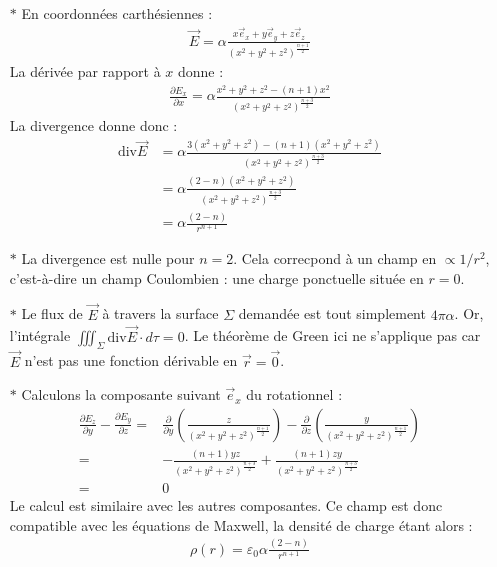 \documentclass{report}
\begin{document}
\begin{itemize}

	\item[$\ast$] En coordonnées carthésiennes :
	\begin{align*}
		\vec{E} = \alpha\frac{x\vec{e}_x+y\vec{e}_y+z\vec{e}_z}{\left(x^2+y^2+z^2 \right)^\frac{n+1}{2}}
	\end{align*}
	La dérivée par rapport à $x$ donne :
	\begin{align*}
		\frac{\partial E_x}{\partial x}=\alpha\frac{x^2+y^2+z^2-(n+1)x^2}{\left(x^2+y^2+z^2 \right)^\frac{n+3}{2}}
	\end{align*}
	La divergence donne donc :
	\begin{align*}
		\mathrm{div}\vec{E} &=\alpha\frac{3(x^2+y^2+z^2)-(n+1)(x^2+y^2+z^2)}{\left(x^2+y^2+z^2 \right)^\frac{n+3}{2}} \\
		&=\alpha\frac{(2-n)(x^2+y^2+z^2)}{\left(x^2+y^2+z^2 \right)^\frac{n+3}{2}} \\
		&=\alpha\frac{(2-n)}{r^{n+1}}
	\end{align*}
	
	\item[$\ast$] La divergence est nulle pour $n=2$. Cela correcpond à un champ en $\propto 1/r^2$, c'est-à-dire un champ Coulombien : une charge ponctuelle située en $r=0$.
	
	\item[$\ast$] Le flux de $\vec{E}$ à travers la surface $\Sigma$ demandée est tout simplement $4\pi\alpha$. Or, l'intégrale $\iiint_\Sigma\mathrm{div}\vec{E}\cdot d\tau=0$. Le théorème de Green ici ne s'applique pas car $\vec{E}$ n'est pas une fonction dérivable en $\vec{r}=\vec{0}$. 
	
	\item[$\ast$] Calculons la composante suivant $\vec{e}_x$ du rotationnel :
	\begin{align*}
		\frac{\partial E_z}{\partial y}-\frac{\partial E_y}{\partial z}=&\frac{\partial }{\partial y}\left( \frac{z}{{\left(x^2+y^2+z^2 \right)^\frac{n+1}{2}}}\right) -\frac{\partial }{\partial z}\left( \frac{y}{{\left(x^2+y^2+z^2 \right)^\frac{n+1}{2}}}\right) \\
		=& -\frac{(n+1)yz}{{\left(x^2+y^2+z^2 \right)^\frac{n+3}{2}}}+\frac{(n+1)zy}{{\left(x^2+y^2+z^2 \right)^\frac{n+3}{2}}} \\
		=&0
	\end{align*}
	Le calcul est similaire avec les autres composantes. Ce champ est donc compatible avec les équations de Maxwell, la densité de charge étant alors :
	\begin{align*}
		\rho(r)=\varepsilon_0\alpha\frac{(2-n)}{r^{n+1}}
	\end{align*}
	
\end{itemize}
\end{document}
